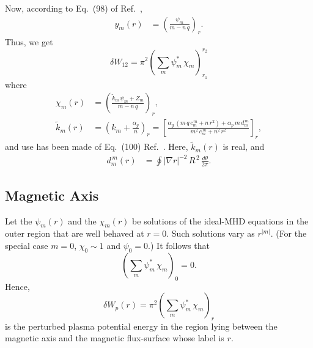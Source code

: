 \documentclass[12pt,prb,aps]{revtex4-1}
\begin{document}
Now, according to Eq.~(98) of Ref.~, 
\begin{align}\label{epsi}
y_m(r) &= \left(\frac{\psi_m}{m-n\,q}\right)_r.
\end{align}
Thus, we get 
\begin{equation}
\delta W_{12}=\pi^2\left(\sum_m\psi_m^\ast\,\chi_m\right)_{r_1}^{r_2}
\end{equation}
where
\begin{align}\label{e29}
\chi_m(r)&=
 \left(\frac{\tilde{k}_m\,\psi_m+Z_m}{m-n\,q}\right)_r,\\[0.5ex]
\tilde{k}_m(r) &=\left( k_m + \frac{\alpha_g}{n} \right)_r= \left[\frac{\alpha_g\,(m\,q\,c_m^{\,m}+n\,r^2)+\alpha_p\,m\,d_m^{\,m}}{m^2\,c_m^{\,m}+n^2\,r^2}\right]_r,\label{e30}
\end{align}
and use has been made of Eq.~(100) Ref.~. Here, $\tilde{k}_m(r)$ is real, and
\begin{align}
d_m^{\,m}(r) &=\oint|\nabla r|^{-2}\,R^{\,2}\,\frac{d\theta}{2\pi}.
\end{align}

\subsection{Magnetic Axis}
Let the $\psi_m(r)$ and the $\chi_m(r)$ be solutions of the ideal-MHD equations in the outer region that are well behaved at $r=0$. 
Such solutions vary as $r^{|m|}$. (For the special case $m=0$, $\chi_0\sim1$ and $\psi_0=0$.) It follows that\,\cite{tj}
\begin{equation}
\left(\sum_m\psi_m^\ast\,\chi_m\right)_{0}=0.
\end{equation}
Hence, 
\begin{equation}\label{e1}
\delta W_p(r) =\pi^2\left(\sum_m\psi_m^\ast\,\chi_m\right)_r
\end{equation}
is the perturbed plasma potential energy in the region lying between the magnetic axis and the magnetic flux-surface whose label is $r$. 
\end{document}
